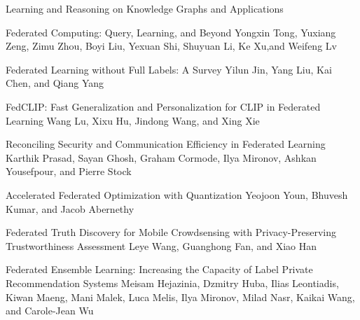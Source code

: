 \documentclass[11pt]{article}
\begin{document}
\begin{bulletin}
\begin{articlesection}{Learning and Reasoning on Knowledge Graphs and Applications}

% 

\begin{article}
{Federated Computing: Query, Learning, and Beyond}
{Yongxin Tong, Yuxiang Zeng, Zimu Zhou, Boyi Liu, Yexuan Shi, Shuyuan Li, Ke Xu,and Weifeng Lv}

\end{article}

\begin{article}
{Federated Learning without Full Labels: A Survey}
{Yilun Jin, Yang Liu, Kai Chen, and Qiang Yang}

\end{article}



\begin{article}
{FedCLIP: Fast Generalization and Personalization for CLIP in Federated Learning}
{Wang Lu, Xixu Hu, Jindong Wang, and Xing Xie}

\end{article}

\begin{article}
{Reconciling Security and Communication Efficiency in Federated Learning}
{Karthik Prasad, Sayan Ghosh, Graham Cormode, Ilya Mironov, Ashkan Yousefpour, and Pierre Stock}

\end{article}

\begin{article}
{Accelerated Federated Optimization with Quantization}
{Yeojoon Youn, Bhuvesh Kumar, and Jacob Abernethy}

\end{article}



\begin{article}
{Federated Truth Discovery for Mobile Crowdsensing with Privacy-Preserving Trustworthiness Assessment}
{Leye Wang, Guanghong Fan, and Xiao Han}

\end{article}

\begin{article}
{Federated Ensemble Learning: Increasing the Capacity of Label Private Recommendation Systems}
{Meisam Hejazinia, Dzmitry Huba, Ilias Leontiadis, Kiwan Maeng, Mani Malek, Luca Melis, Ilya Mironov, Milad Nasr, Kaikai Wang, and Carole-Jean Wu}

\end{article}


\end{articlesection}
\end{bulletin}
\end{document}
